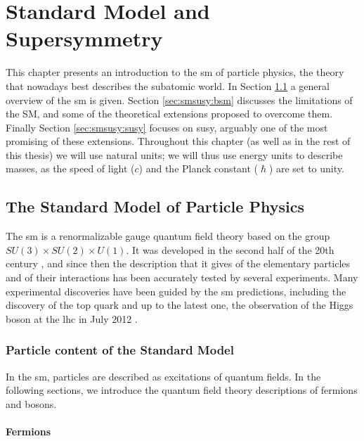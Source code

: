 \chapter{Standard Model and Supersymmetry}
\label{chap:SMSUSY}

This chapter presents an introduction to the \gls{sm} of particle physics, the theory that nowadays best describes the subatomic world. In Section \ref{sec:smsusy:sm} a general overview of the \gls{sm} is given. Section \ref{sec:smsusy:bsm} discusses the limitations of the SM, and some of the theoretical extensions proposed to overcome them. Finally Section \ref{sec:smsusy:susy} focuses on \gls{susy}, arguably one of the most promising of these extensions. Throughout this chapter (as well as in the rest of this thesis) we will use natural units; we will thus use energy units to describe masses, as the speed of light ($c$) and the Planck constant ($\hslash$) are set to unity.


\section{The Standard Model of Particle Physics}
\label{sec:smsusy:sm}

The \gls{sm} is a renormalizable gauge quantum field theory based on the group $SU(3) \times SU(2) \times U(1)$. It was developed in the second half of the 20th century \cite{Glashow:1961tr, Weinberg:1967tq, Salam:1980jd}, and since then the description that it gives of the elementary particles and of their interactions has been accurately tested by several experiments. Many experimental discoveries have been guided by the \gls{sm} predictions, including the discovery of the top quark \cite{Abachi:1994td, PhysRevLett.74.2626} and up to the latest one, the observation of the Higgs boson at the \gls{lhc} in July 2012 \cite{Aad:2012tfa, Chatrchyan:2012xdj}. 

\subsection{Particle content of the Standard Model}

In the \gls{sm}, particles are described as excitations of quantum fields. In the following sections, we introduce the quantum field theory descriptions of fermions and bosons.

\subsubsection*{Fermions}

